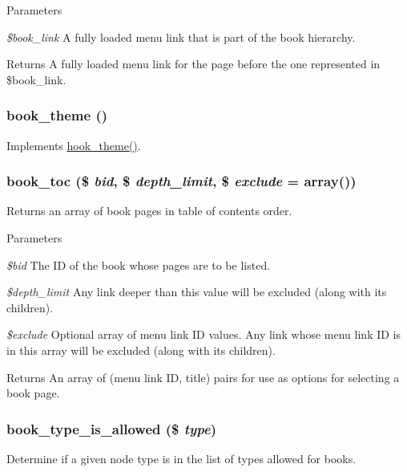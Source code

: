 \begin{DoxyParams}{Parameters}
\item[{\em \$book\_\-link}]A fully loaded menu link that is part of the book hierarchy.\end{DoxyParams}
\begin{DoxyReturn}{Returns}
A fully loaded menu link for the page before the one represented in \$book\_\-link. 
\end{DoxyReturn}
\hypertarget{book_8module_a4fe037bcee04d09c34a92b0be7bd945a}{
\subsubsection[{book\_\-theme}]{\setlength{\rightskip}{0pt plus 5cm}book\_\-theme ()}}
\label{book_8module_a4fe037bcee04d09c34a92b0be7bd945a}
Implements \hyperlink{group__hooks_ga013ccb45c7aaab1c16cf9691428c910d}{hook\_\-theme()}. \hypertarget{book_8module_a36327566aaf222eb728c9aa69b554e69}{
\subsubsection[{book\_\-toc}]{\setlength{\rightskip}{0pt plus 5cm}book\_\-toc (\$ {\em bid}, \/  \$ {\em depth\_\-limit}, \/  \$ {\em exclude} = {\ttfamily array()})}}
\label{book_8module_a36327566aaf222eb728c9aa69b554e69}
Returns an array of book pages in table of contents order.


\begin{DoxyParams}{Parameters}
\item[{\em \$bid}]The ID of the book whose pages are to be listed. \item[{\em \$depth\_\-limit}]Any link deeper than this value will be excluded (along with its children). \item[{\em \$exclude}]Optional array of menu link ID values. Any link whose menu link ID is in this array will be excluded (along with its children).\end{DoxyParams}
\begin{DoxyReturn}{Returns}
An array of (menu link ID, title) pairs for use as options for selecting a book page. 
\end{DoxyReturn}
\hypertarget{book_8module_adf79a6a651254abd81342a60c5321008}{
\subsubsection[{book\_\-type\_\-is\_\-allowed}]{\setlength{\rightskip}{0pt plus 5cm}book\_\-type\_\-is\_\-allowed (\$ {\em type})}}
\label{book_8module_adf79a6a651254abd81342a60c5321008}
Determine if a given node type is in the list of types allowed for books.


